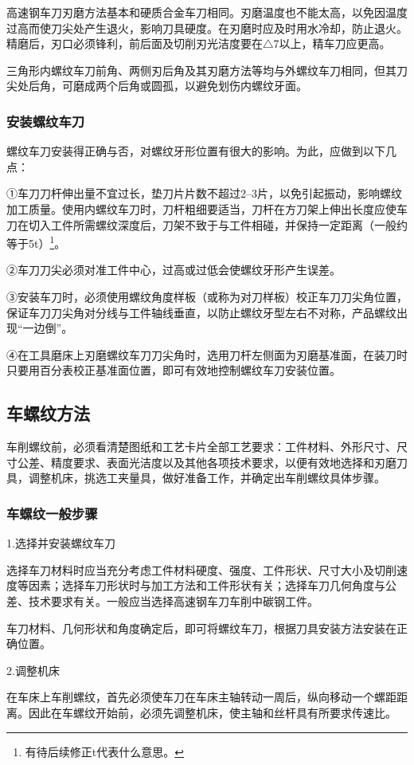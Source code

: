 \documentclass{ctexbook}
\begin{document}
高速钢车刀刃磨方法基本和硬质合金车刀相同。刃磨温度也不能太高，以免因温度过高而使刀尖处产生退火，影响刀具硬度。在刃磨时应及时用水冷却，防止退火。精磨后，刃口必须锋利，前后面及切削刃光洁度要在$\bigtriangleup$7以上，精车刀应更高。

三角形内螺纹车刀前角、两侧刃后角及其刃磨方法等均与外螺纹车刀相同，但其刀尖处后角，可磨成两个后角或圆孤，以避免划伤内螺纹牙面。
\subsubsection{安装螺纹车刀}
螺纹车刀安装得正确与否，对螺纹牙形位置有很大的影响。为此，应做到以下几点：

①车刀刀杆伸出量不宜过长，垫刀片片数不超过2--3片，以免引起振动，影响螺纹加工质量。使用内螺纹车刀时，刀杆粗细要适当，刀杆在方刀架上伸出长度应使车刀在切入工件所需螺纹深度后，刀架不致于与工件相碰，并保持一定距离（一般约等于5t）\footnote{有待后续修正t代表什么意思。}。

②车刀刀尖必须对准工件中心，过高或过低会使螺纹牙形产生误差。

③安装车刀时，必须使用螺纹角度样板（或称为对刀样板）校正车刀刀尖角位置，保证车刀刀尖角对分线与工件轴线垂直，以防止螺纹牙型左右不对称，产品螺纹出现“一边倒”。

④在工具磨床上刃磨螺纹车刀刀尖角时，选用刀杆左侧面为刃磨基准面，在装刀时只要用百分表校正基准面位置，即可有效地控制螺纹车刀安装位置。
\subsection{车螺纹方法}
车削螺纹前，必须看清楚图纸和工艺卡片全部工艺要求：工件材料、外形尺寸、尺寸公差、精度要求、表面光洁度以及其他各项技术要求，以便有效地选择和刃磨刀具，调整机床，挑选工夹量具，做好准备工作，并确定出车削螺纹具体步骤。
\subsubsection{车螺纹一般步骤}
1.选择并安装螺纹车刀

选择车刀材料时应当充分考虑工件材料硬度、强度、工件形状、尺寸大小及切削速度等因素；选择车刀形状时与加工方法和工件形状有关；选择车刀几何角度与公差、技术要求有关。一般应当选择高速钢车刀车削中碳钢工件。

车刀材料、几何形状和角度确定后，即可将螺纹车刀，根据刀具安装方法安装在正确位置。

2.调整机床

在车床上车削螺纹，首先必须使车刀在车床主轴转动一周后，纵向移动一个螺距距离。因此在车螺纹开始前，必须先调整机床，使主轴和丝杆具有所要求传速比。
\end{document}
